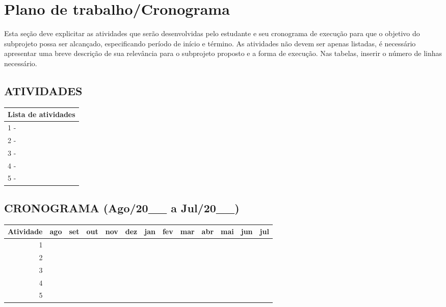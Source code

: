 \documentclass[10pt, a4paper]{article}
\begin{document}
\section{Plano de trabalho/Cronograma}

Esta seção deve explicitar as atividades que serão desenvolvidas pelo estudante e seu cronograma de execução para que o objetivo do subprojeto possa ser alcançado, especificando período de início e término. As atividades não devem ser apenas listadas, é necessário apresentar uma breve descrição de sua relevância para o subprojeto proposto e a forma de execução. Nas tabelas, inserir o número de linhas necessário.


\subsection*{ATIVIDADES}

\begin{tabular}{|p{145mm}|}
\hline
\textbf{Lista de atividades} \\
\hline
1 -  \\
\hline
2 -  \\
\hline
3 -  \\
\hline
4 -  \\
\hline
5 -  \\
\hline
\end{tabular}

\subsection*{CRONOGRAMA (Ago/20\_\_ a Jul/20\_\_)}


\begin{tabular}{|r|l|l|l|l|l|l|l|l|l|l|l|l|}
\hline
Atividade & ago & set & out & nov & dez & jan & fev & mar & abr & mai & jun & jul\\
\hline
1 &   &   &   &    &  &   &   &   &   &   &   &  \\
\hline
2 &   &   &   &   &   &   &    &    &   &   &   &  \\
\hline
3 &   &   &   &   &   &   &   &   &    &   &  & \\
\hline
4 &   &   &   &   &   &   &   &   &   &    &   &  \\
\hline
5 &   &   &   &   &   &   &   &   &   &    &   &  \\
\hline
\end{tabular}


%



\end{document}
